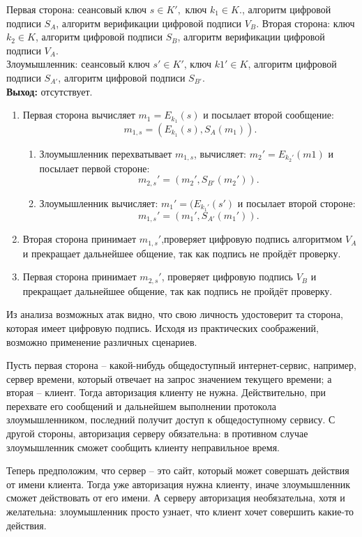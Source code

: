 Первая сторона: сеансовый ключ $s\in K',$ ключ $k_{1}\in K.$, алгоритм цифровой подписи $S_{A}$, алгоритм верификации цифровой подписи $V_{B}$.
Вторая сторона: ключ $k_{2}\in K$, алгоритм цифровой подписи $S_{B}$, алгоритм верификации цифровой подписи $V_{A}.$\\
Злоумышленник: сеансовый ключ $s' \in K'$,  ключ $k1'\in K$, алгоритм цифровой подписи $S_{A'}$, алгоритм цифровой подписи $S_{B'}$. \\
\hspace*{10mm}\textbf{Выход:} отсутствует.
\begin{enumerate}
	\item Первая сторона вычисляет $m_{1} = E_{k_{1}}(s)$ и посылает второй сообщение:
	$$m_{1,s} = (E_{k_{1}}(s), S_{A}(m_{1})).$$
	\begin{enumerate}
		\item Злоумышленник перехватывает $m_{1,s}$, вычисляет: $m_{2}' = E_{k_{2}'}(m1)$ и посылает первой стороне: 
		$$m_{2,s}'= (m_{2}',S_{B'}(m_{2}')).$$
		\item Злоумышленник вычисляет: $m_{1}' = (E_{k_{1}'}(s')$ и посылает второй стороне:
		$$m_{1,s}' = (m_{1}',S_{A'}(m_{1}')).$$
	\end{enumerate}
	\item Вторая сторона принимает $m_{1,s}'$,проверяет цифровую подпись алгоритмом $V_{A}$ и прекращает дальнейшее общение, так как подпись не пройдёт проверку.
	\item Первая сторона принимает $m_{2,s}'$, проверяет цифровую подпись $V_{B}$ и прекращает дальнейшее общение, так как подпись не пройдёт проверку.
\end{enumerate}
Из анализа возможных атак видно, что свою личность удостоверит та сторона, которая имеет цифровую подпись. Исходя из практических соображений, возможно применение различных сценариев. 

Пусть первая сторона – какой-нибудь общедоступный интернет-сервис, например, сервер времени, который отвечает на запрос значением текущего времени; а вторая – клиент. Тогда авторизация клиенту не нужна. Действительно, при перехвате его сообщений и дальнейшем выполнении протокола злоумышленником, последний получит доступ к общедоступному сервису. С другой стороны, авторизация серверу обязательна: в противном случае злоумышленник сможет сообщить клиенту неправильное время. 

Теперь предположим, что сервер – это сайт, который может совершать действия от имени клиента. Тогда уже авторизация нужна клиенту, иначе злоумышленник сможет действовать от его имени. А серверу авторизация необязательна, хотя и желательна: злоумышленник просто узнает, что клиент хочет совершить какие-то действия. 

